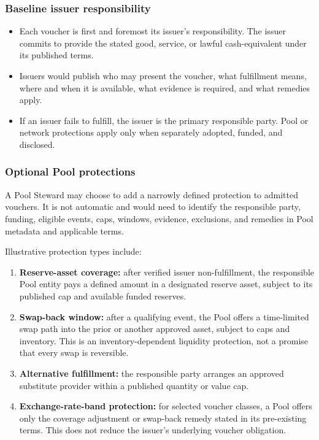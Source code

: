\documentclass[11pt]{article}
\begin{document}
\subsubsection*{Baseline issuer responsibility}

\begin{itemize}[leftmargin=*]
\item Each voucher is first and foremost its issuer's responsibility. The issuer commits to provide the stated good, service, or lawful cash-equivalent under its published terms.
\item Issuers would publish who may present the voucher, what fulfillment means, where and when it is available, what evidence is required, and what remedies apply.
\item If an issuer fails to fulfill, the issuer is the primary responsible party. Pool or network protections apply only when separately adopted, funded, and disclosed.
\end{itemize}
\subsubsection*{Optional Pool protections}

A Pool Steward may choose to add a narrowly defined protection to admitted vouchers. It is not automatic and would need to identify the responsible party, funding, eligible events, caps, windows, evidence, exclusions, and remedies in Pool metadata and applicable terms.

Illustrative protection types include:

\begin{enumerate}[leftmargin=*]
\item \textbf{Reserve-asset coverage:} after verified issuer non-fulfillment, the responsible Pool entity pays a defined amount in a designated reserve asset, subject to its published cap and available funded reserves.
\item \textbf{Swap-back window:} after a qualifying event, the Pool offers a time-limited swap path into the prior or another approved asset, subject to caps and inventory. This is an inventory-dependent liquidity protection, not a promise that every swap is reversible.
\item \textbf{Alternative fulfillment:} the responsible party arranges an approved substitute provider within a published quantity or value cap.
\item \textbf{Exchange-rate-band protection:} for selected voucher classes, a Pool offers only the coverage adjustment or swap-back remedy stated in its pre-existing terms. This does not reduce the issuer's underlying voucher obligation.
\end{enumerate}
\end{document}

